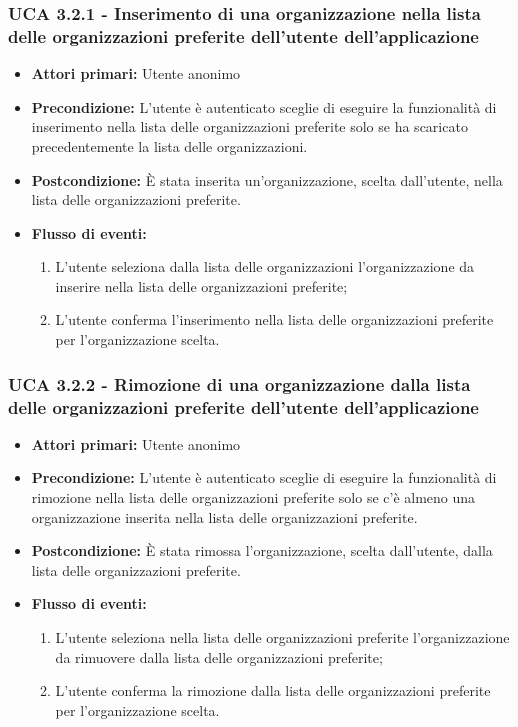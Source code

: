 \subsubsection{UCA 3.2.1 - Inserimento di una organizzazione nella lista delle organizzazioni preferite dell'utente dell'applicazione}%
\begin{itemize}
	\item \textbf{Attori primari:} Utente anonimo
	\item \textbf{Precondizione:} L'utente è autenticato sceglie di eseguire la funzionalità di inserimento nella lista delle organizzazioni preferite solo se ha scaricato precedentemente la lista delle organizzazioni.
	\item \textbf{Postcondizione:} È stata inserita un'organizzazione, scelta dall'utente, nella lista delle organizzazioni preferite.
	\item \textbf{Flusso di eventi:}
	\begin{enumerate}
		\item L'utente seleziona dalla lista delle organizzazioni l'organizzazione da inserire nella lista delle organizzazioni preferite;
		\item L'utente conferma l'inserimento nella lista delle organizzazioni preferite per l'organizzazione scelta.
	\end{enumerate}
\end{itemize}

\subsubsection{UCA 3.2.2 - Rimozione di una organizzazione dalla lista delle organizzazioni preferite dell'utente dell'applicazione}%
\begin{itemize}
	\item \textbf{Attori primari:} Utente anonimo
	\item \textbf{Precondizione:}  L'utente è autenticato sceglie di eseguire la funzionalità di rimozione nella lista delle organizzazioni preferite solo se c'è almeno una organizzazione inserita nella lista delle organizzazioni preferite.
	\item \textbf{Postcondizione:} È stata rimossa l'organizzazione, scelta dall'utente, dalla lista delle organizzazioni preferite.
	\item \textbf{Flusso di eventi:}
	\begin{enumerate}
		\item L'utente seleziona nella lista delle organizzazioni preferite l'organizzazione da rimuovere dalla lista delle organizzazioni preferite;
		\item L'utente conferma la rimozione dalla lista delle organizzazioni preferite per l'organizzazione scelta.
	\end{enumerate}
\end{itemize}



